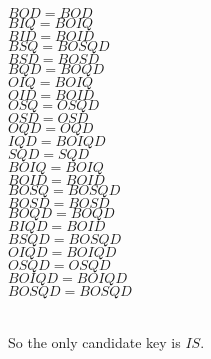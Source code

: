 \documentclass[12pt]{article}
\begin{document}
\begin{minipage}[t]{0.5\textwidth} %
    $BOD = BOD$ \\
    $BIQ = BOIQ$ \\
    $BID = BOID$ \\
    $BSQ = BOSQD$ \\
    $BSD = BOSD$ \\
    $BQD = BOQD $ \\
    $OIQ = BOIQ $ \\
    $OID = BOID $ \\
    $OSQ = OSQD $ \\
    $OSD = OSD $ \\
    $OQD = OQD$\\
    $IQD = BOIQD$\\
    $SQD = SQD$\\
    $BOIQ=BOIQ$\\
    $BOID=BOID$\\
    $BOSQ=BOSQD$\\
    $BOSD=BOSD$\\
    $BOQD=BOQD$\\
    $BIQD=BOID$\\
    $BSQD=BOSQD$\\
    $OIQD=BOIQD$\\
    $OSQD=OSQD$\\
    $BOIQD=BOIQD$\\
    $BOSQD=BOSQD$\\
\end{minipage}\\

So the only candidate key is $IS$.\\
\newpage
\end{document}
